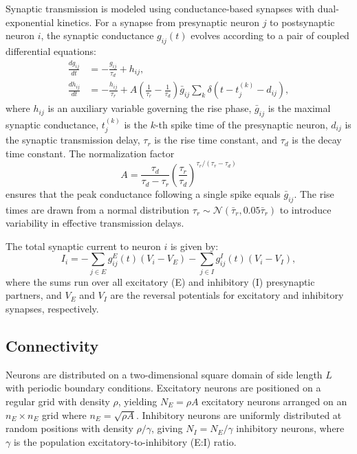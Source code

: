 \documentclass[%
	preprint, %
	amsmath,
	amssymb,
	aps,
	prx,
	floatfix,
	11pt %
]{revtex4-2}
\begin{document}
Synaptic transmission is modeled using conductance-based synapses with dual-exponential kinetics. For a synapse from presynaptic neuron $j$ to postsynaptic neuron $i$, the synaptic conductance $g_{ij}(t)$ evolves according to a pair of coupled differential equations:
\begin{align}
    \frac{dg_{ij}}{dt} &= -\frac{g_{ij}}{\tau_d} + h_{ij}, \\
    \frac{dh_{ij}}{dt} &= -\frac{h_{ij}}{\tau_r} + A \left(\frac{1}{\tau_r} - \frac{1}{\tau_d}\right) \bar{g}_{ij} \sum_k \delta(t - t_j^{(k)} - d_{ij}),
\end{align}
where $h_{ij}$ is an auxiliary variable governing the rise phase, $\bar{g}_{ij}$ is the maximal synaptic conductance, $t_j^{(k)}$ is the $k$-th spike time of the presynaptic neuron, $d_{ij}$ is the synaptic transmission delay, $\tau_r$ is the rise time constant, and $\tau_d$ is the decay time constant. The normalization factor
\begin{equation}
    A = \frac{\tau_d}{\tau_d - \tau_r} \left(\frac{\tau_r}{\tau_d}\right)^{\tau_r/(\tau_r - \tau_d)}
\end{equation}
ensures that the peak conductance following a single spike equals $\bar{g}_{ij}$. The rise times are drawn from a normal distribution $\tau_r \sim \mathcal{N}(\bar{\tau}_r, 0.05\bar{\tau}_r)$ to introduce variability in effective transmission delays.

The total synaptic current to neuron $i$ is given by:
\begin{equation}
    I_{i} = -\sum_{j \in E} g_{ij}^E(t)(V_i - V_E) - \sum_{j \in I} g_{ij}^I(t)(V_i - V_I),
\end{equation}
where the sums run over all excitatory (E) and inhibitory (I) presynaptic partners, and $V_E$ and $V_I$ are the reversal potentials for excitatory and inhibitory synapses, respectively.

\subsection{Connectivity}

Neurons are distributed on a two-dimensional square domain of side length $L$ with periodic boundary conditions.
Excitatory neurons are positioned on a regular grid with density $\rho$, yielding $N_E = \rho A$ excitatory neurons arranged on an $n_E \times n_E$ grid where $n_E = \sqrt{\rho A}$.
Inhibitory neurons are uniformly distributed at random positions with density $\rho/\gamma$, giving $N_I = N_E/\gamma$ inhibitory neurons, where $\gamma$ is the population excitatory-to-inhibitory (E:I) ratio.
\end{document}
